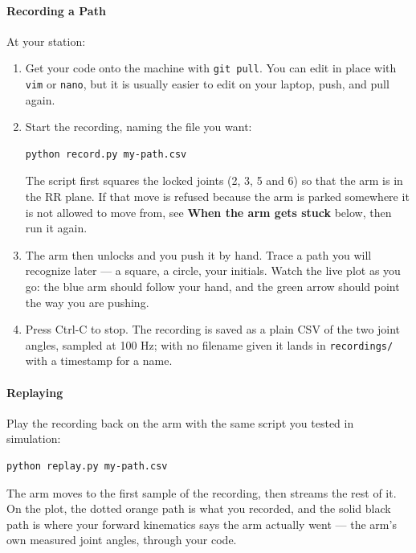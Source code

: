 \documentclass{16384_doc}
\begin{document}
\begin{questions}
    \paragraph{Recording a Path} At your station:
    \begin{enumerate}
      \item Get your code onto the machine with \verb!git pull!.  You can edit in
            place with \verb!vim! or \verb!nano!, but it is usually easier to edit
            on your laptop, push, and pull again.
      \item Start the recording, naming the file you want:
            \begin{verbatim}
python record.py my-path.csv
            \end{verbatim}
            The script first squares the locked joints (2, 3, 5 and 6) so that
            the arm is in the RR plane.  If that move is refused because the arm
            is parked somewhere it is not allowed to move from, see
            \textbf{When the arm gets stuck} below, then run it again.
      \item The arm then unlocks and you push it by hand.  Trace a path you
            will recognize later --- a square, a circle, your initials.  Watch the
            live plot as you go: the blue arm should follow your hand, and the
            green arrow should point the way you are pushing.
      \item Press Ctrl-C to stop.  The recording is saved as a plain CSV of the
            two joint angles, sampled at 100 Hz; with no filename given it lands
            in \verb!recordings/! with a timestamp for a name.
    \end{enumerate}

    \paragraph{Replaying} Play the recording back on the arm with the same
    script you tested in simulation:
    \begin{verbatim}python replay.py my-path.csv\end{verbatim}
    The arm moves to the first sample of the recording, then streams the rest of
    it.  On the plot, the dotted orange path is what you recorded, and the solid
    black path is where your forward kinematics says the arm actually went ---
    the arm's own measured joint angles, through your code.


\end{questions}
\end{document}
